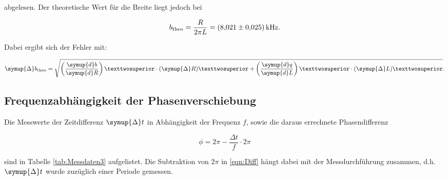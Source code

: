 abgelesen.
Der theoretische Wert für die Breite liegt jedoch bei 

\begin{equation*}
b_\text{theo} = \frac{R}{2\pi L} = \SI{8.021+-0.025}{\kilo\hertz}.
\end{equation*}

Dabei ergibt sich der Fehler mit: 

\begin{equation*}
\symup{\Delta}b_\text{theo} = \sqrt{\left(\frac{\symup{d}b}{\symup{d}R}\right)²\cdot(\symup{\Delta}R)² +
\left(\frac{\symup{d}q}{\symup{d}L}\right)²\cdot(\symup{\Delta}L)²}.
\end{equation*}

\subsection{Frequenzabhängigkeit der Phasenverschiebung}

Die Messwerte der Zeitdifferenz $\symup{\Delta} t$ in Abhängigkeit der Frequenz $f$, sowie die daraus errechnete
Phasendifferenz

\begin{equation}
  \phi = 2 \pi - \frac{\Delta t}{f} \cdot 2 \pi
  \label{eqn:Diff}
\end{equation}

sind in Tabelle \ref{tab:Messdaten3} aufgelistet. Die Subtraktion von $2 \pi$ in \eqref{eqn:Diff} hängt dabei mit der 
Messdurchführung zusammen, d.h. $\symup{\Delta} t$ wurde zuzüglich einer Periode gemessen. 



